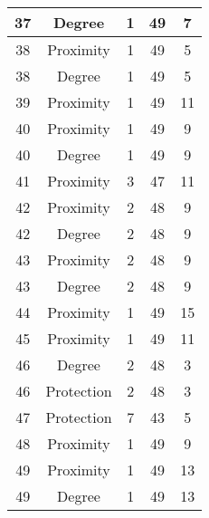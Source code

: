 \documentclass[results.tex]{subfiles}
\begin{document}
\begin{center}
\begin{tabular}{| c || c | c | c | c |}
    37 & Degree & 1 & 49 & 7 \\ 
    \hline
    38 & Proximity & 1 & 49 & 5 \\ 
    \hline
    38 & Degree & 1 & 49 & 5 \\ 
    \hline
    39 & Proximity & 1 & 49 & 11 \\ 
    \hline
    40 & Proximity & 1 & 49 & 9 \\ 
    \hline
    40 & Degree & 1 & 49 & 9 \\ 
    \hline
    41 & Proximity & 3 & 47 & 11 \\ 
    \hline
    42 & Proximity & 2 & 48 & 9 \\ 
    \hline
    42 & Degree & 2 & 48 & 9 \\ 
    \hline
    43 & Proximity & 2 & 48 & 9 \\ 
    \hline
    43 & Degree & 2 & 48 & 9 \\ 
    \hline
    44 & Proximity & 1 & 49 & 15 \\ 
    \hline
    45 & Proximity & 1 & 49 & 11 \\ 
    \hline
    46 & Degree & 2 & 48 & 3 \\ 
    \hline
    46 & Protection & 2 & 48 & 3 \\ 
    \hline
    47 & Protection & 7 & 43 & 5 \\ 
    \hline
    48 & Proximity & 1 & 49 & 9 \\ 
    \hline
    49 & Proximity & 1 & 49 & 13 \\ 
    \hline
    49 & Degree & 1 & 49 & 13 \\ 
    \hline   \end{tabular}
\end{center}
\end{document}
